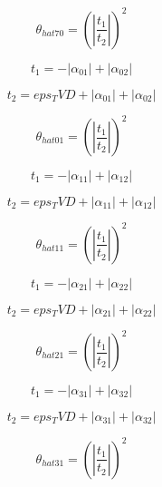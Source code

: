 \documentclass{article}
\begin{document}
\begin{dmath}\theta_{hat 70} = \left(\left|{\frac{t_{1}}{t_{2}}}\right| \right)^{2}\end{dmath}

\begin{dmath}t_{1} = - \left|{\alpha_{01}}\right| + \left|{\alpha_{02}}\right|\end{dmath}

\begin{dmath}t_{2} = eps_TVD + \left|{\alpha_{01}}\right| + \left|{\alpha_{02}}\right|\end{dmath}

\begin{dmath}\theta_{hat 01} = \left(\left|{\frac{t_{1}}{t_{2}}}\right| \right)^{2}\end{dmath}

\begin{dmath}t_{1} = - \left|{\alpha_{11}}\right| + \left|{\alpha_{12}}\right|\end{dmath}

\begin{dmath}t_{2} = eps_TVD + \left|{\alpha_{11}}\right| + \left|{\alpha_{12}}\right|\end{dmath}

\begin{dmath}\theta_{hat 11} = \left(\left|{\frac{t_{1}}{t_{2}}}\right| \right)^{2}\end{dmath}

\begin{dmath}t_{1} = - \left|{\alpha_{21}}\right| + \left|{\alpha_{22}}\right|\end{dmath}

\begin{dmath}t_{2} = eps_TVD + \left|{\alpha_{21}}\right| + \left|{\alpha_{22}}\right|\end{dmath}

\begin{dmath}\theta_{hat 21} = \left(\left|{\frac{t_{1}}{t_{2}}}\right| \right)^{2}\end{dmath}

\begin{dmath}t_{1} = - \left|{\alpha_{31}}\right| + \left|{\alpha_{32}}\right|\end{dmath}

\begin{dmath}t_{2} = eps_TVD + \left|{\alpha_{31}}\right| + \left|{\alpha_{32}}\right|\end{dmath}

\begin{dmath}\theta_{hat 31} = \left(\left|{\frac{t_{1}}{t_{2}}}\right| \right)^{2}\end{dmath}
\end{document}
